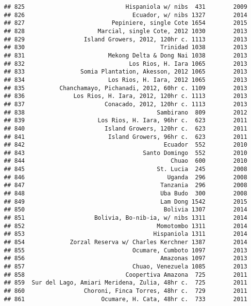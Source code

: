 \documentclass[
]{article}
\begin{document}
\begin{verbatim}
## 825                             Hispaniola w/ nibs  431        2009
## 826                               Ecuador, w/ nibs 1327        2014
## 827                         Pepiniere, single Cote 1654        2015
## 828                     Marcial, single Cote, 2012 1030        2013
## 829                 Island Growers, 2012, 120hr c. 1113        2013
## 830                                       Trinidad 1038        2013
## 831                        Mekong Delta & Dong Nai 1038        2013
## 832                              Los Rios, H. Iara 1065        2013
## 833                Somia Plantation, Akesson, 2012 1065        2013
## 834                        Los Rios, H. Iara, 2012 1065        2013
## 835          Chanchamayo, Pichanadi, 2012, 60hr c. 1109        2013
## 836              Los Rios, H. Iara, 2012, 120hr c. 1113        2013
## 837                       Conacado, 2012, 120hr c. 1113        2013
## 838                                      Sambirano  809        2012
## 839                     Los Rios, H. Iara, 96hr c.  623        2011
## 840                       Island Growers, 120hr c.  623        2011
## 841                        Island Growers, 96hr c.  623        2011
## 842                                        Ecuador  552        2010
## 843                                  Santo Domingo  552        2010
## 844                                          Chuao  600        2010
## 845                                      St. Lucia  245        2008
## 846                                         Uganda  296        2008
## 847                                       Tanzania  296        2008
## 848                                       Uba Budo  300        2008
## 849                                       Lam Dong 1542        2015
## 850                                        Bolivia 1307        2014
## 851                    Bolivia, Bo-nib-ia, w/ nibs 1311        2014
## 852                                      Momotombo 1311        2014
## 853                                     Hispaniola 1311        2014
## 854             Zorzal Reserva w/ Charles Kerchner 1387        2014
## 855                               Ocumare, Cumboto 1097        2013
## 856                                       Amazonas 1097        2013
## 857                               Chuao, Venezuela 1085        2013
## 858                             Coopertiva Amazona  725        2011
## 859  Sur del Lago, Amiari Meridena, Zulia, 48hr c.  725        2011
## 860                 Choroni, Finca Torres, 48hr c.  729        2011
## 861                      Ocumare, H. Cata, 48hr c.  733        2011

\end{verbatim}
\end{document}
